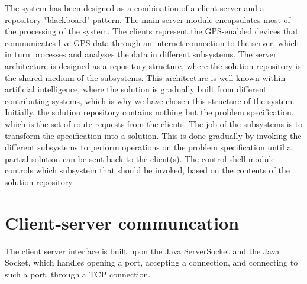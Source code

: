 The system has been designed as a combination of a client-server and a repository "blackboard" pattern. The main server module encapsulates most of the processing of the system. The clients represent the GPS-enabled devices that communicates live GPS data through an internet connection to the server, which in turn processes and analyses the data in different subsystems. The server architecture is designed as a repository structure, where the solution repository is the shared medium of the subsystems. This architecture is well-known within artificial intelligence, where the solution is gradually built from different contributing systems, which is why we have chosen this structure of the system. Initially, the solution repository contains nothing but the problem specification, which is the set of route requests from the clients. The job of the subsystems is to transform the specification into a solution. This is done gradually by invoking the different subsystems to perform operations on the problem specification until a partial solution can be sent back to the client(s). The control shell module controls which subsystem that should be invoked, based on the contents of the solution repository. 

\section{Client-server communcation}
The client server interface is built upon the Java ServerSocket and the Java Socket,
which handles opening a port, accepting a connection, and connecting to such a port,
through a TCP connection.

